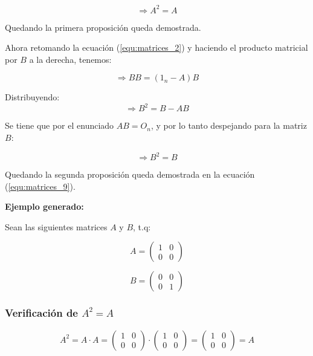 \documentclass{article}
\begin{document}
\begin{enumerate}
\begin{equation}
\label{equ:matrices_6}
\Rightarrow A^2=A
\end{equation}

Quedando la primera proposición queda demostrada.

Ahora retomando la ecuación (\ref{equ:matrices_2}) y haciendo el producto matricial por $B$ a la derecha, tenemos:

\begin{equation}
\label{equ:matrices_7}
\Rightarrow BB = (1_n-A)B 
\end{equation}

Distribuyendo: 
\begin{equation}
\label{equ:matrices_8}
\Rightarrow B^2 = B-AB
\end{equation}

Se tiene que por el enunciado $AB=O_n$, y por lo tanto despejando para la matriz $B$: 

\begin{equation}
\label{equ:matrices_9}
\Rightarrow  B^2=B
\end{equation}

Quedando la segunda proposición queda demostrada en la ecuación (\ref{equ:matrices_9}).

\vspace{0.2cm}

\textbf{Ejemplo generado:}

Sean las siguientes matrices $A$ y $B$, t.q:

\begin{equation}
\label{equ:matrices_10}
A =
\begin{pmatrix}
1 & 0 \\
0 & 0
\end{pmatrix}
\end{equation}

\begin{equation}
\label{equ:matrices_11}
B =
\begin{pmatrix}
0 & 0 \\
0 & 1
\end{pmatrix}
\end{equation}

\subsubsection*{Verificación de $A^2 = A$}

\begin{equation}
\label{equ:matrices_12}
A^2 = A \cdot A =
\begin{pmatrix}
1 & 0 \\
0 & 0
\end{pmatrix}
\cdot
\begin{pmatrix}
1 & 0 \\
0 & 0
\end{pmatrix}
=
\begin{pmatrix}
1 & 0 \\
0 & 0
\end{pmatrix}
= A
\end{equation}


\end{enumerate}
\end{document}
